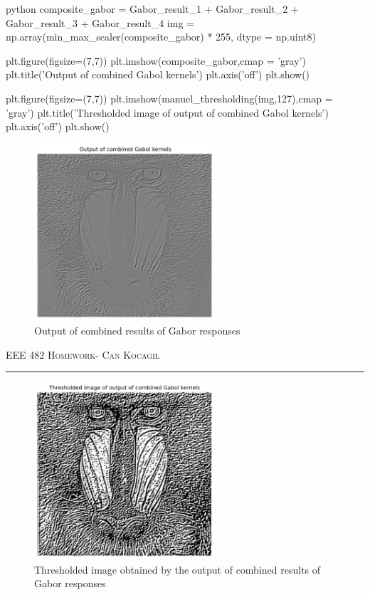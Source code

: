 \documentclass[12pt]{amsart}
\begin{document}
\begin{mintedbox}{python}
composite_gabor = Gabor_result_1 + Gabor_result_2 + Gabor_result_3 + Gabor_result_4
img = np.array(min_max_scaler(composite_gabor) * 255, dtype = np.uint8)

plt.figure(figsize=(7,7))
plt.imshow(composite_gabor,cmap = 'gray')
plt.title('Output of combined Gabol kernels')
plt.axis('off')
plt.show()

plt.figure(figsize=(7,7))
plt.imshow(manuel_thresholding(img,127),cmap = 'gray')
plt.title('Thresholded image of output of combined Gabol kernels')
plt.axis('off')
plt.show()
\end{mintedbox}

\begin{figure}[ht]
    \centering
    \includegraphics[width = 0.6\textwidth]{images/comb_conv.png}
    \caption{Output of combined results of Gabor responses}
\end{figure}

\newpage
{\scshape EEE 482} \hfill {\scshape \large  Homework-\relax} \hfill {\scshape Can Kocagil}
\smallskip
\hrule
\vspace{2mm}

\begin{figure}[ht]
    \centering
    \includegraphics[width = 0.6\textwidth]{images/comb_conv_thres.png}
    \caption{Thresholded image obtained by the output of combined results of Gabor responses}
\end{figure}
\end{document}
